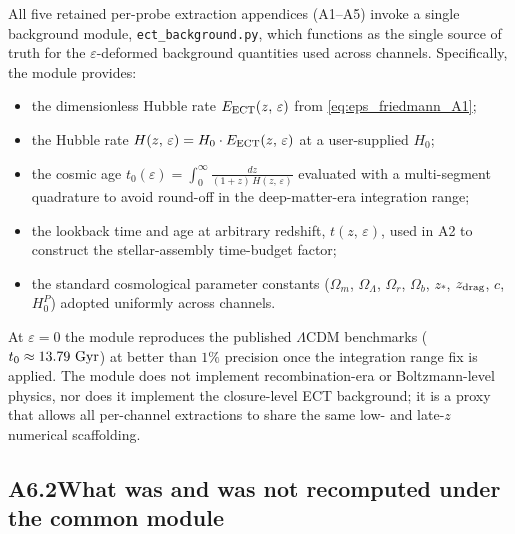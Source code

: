 All five retained per-probe extraction appendices (A1--A5) invoke
a single background module, \texttt{ect\_background.py}, which
functions as the single source of truth for the
$\varepsilon$-deformed background quantities used across channels.
Specifically, the module provides:
\begin{itemize}
\item the dimensionless Hubble rate
$E_{\rm ECT}(z,\,\varepsilon)$ from
\eqref{eq:eps_friedmann_A1};
\item the Hubble rate
$H(z,\,\varepsilon) = H_0 \cdot E_{\rm ECT}(z,\,\varepsilon)$
at a user-supplied $H_0$;
\item the cosmic age
$t_0(\varepsilon)
  = \int_0^{\infty}\frac{dz}{(1+z)\,H(z,\,\varepsilon)}$
evaluated with a multi-segment quadrature to avoid
round-off in the deep-matter-era integration range;
\item the lookback time and age at arbitrary redshift,
$t(z,\,\varepsilon)$, used in A2 to construct the
stellar-assembly time-budget factor;
\item the standard cosmological parameter constants
($\Omega_m$, $\Omega_\Lambda$, $\Omega_r$, $\Omega_b$,
$z_*$, $z_{\rm drag}$, $c$, $H_0^P$) adopted uniformly
across channels.
\end{itemize}
At $\varepsilon = 0$ the module reproduces the published
$\Lambda$CDM benchmarks ($t_0 \approx 13.79~{\rm Gyr}$) at
better than $1\%$ precision once the integration range fix is
applied. The module does not implement recombination-era or
Boltzmann-level physics, nor does it implement the closure-level
ECT background; it is a proxy that allows all per-channel
extractions to share the same low- and late-$z$ numerical
scaffolding.

\subsection*{A6.2\quad What was and was not recomputed under the
common module}

